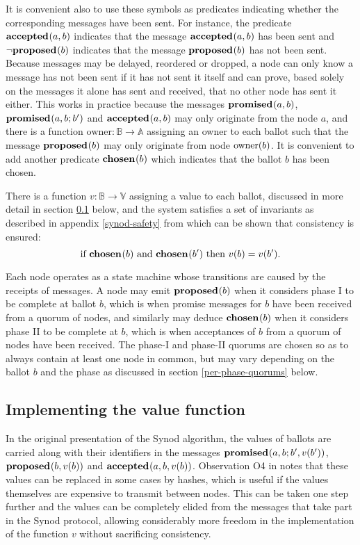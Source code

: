 \documentclass[journal]{IEEEtran}
\begin{document}
It is convenient also to use these symbols as predicates indicating whether the
corresponding messages have been sent. For instance, the predicate
$\mathbf{accepted}_{}(a,b)$ indicates that the message $\mathbf{accepted}_{}(a,b)$ has been sent and
$\neg \mathbf{proposed}_{}(b)$ indicates that the message $\mathbf{proposed}_{}(b)$ has not been sent.
Because messages may be delayed, reordered or dropped, a node can only know a
message has not been sent if it has not sent it itself and can prove, based
solely on the messages it alone has sent and received, that no other node has
sent it either. This works in practice because the messages $\mathbf{promised}_{}(a,b)$,
$\mathbf{promised}_{}(a,b;b')$ and $\mathbf{accepted}_{}(a,b)$ may only originate from the node $a$,
and there is a function $\mathrm{owner} : \mathbb B \to \mathbb A$ assigning an
owner to each ballot such that the message $\mathbf{proposed}_{}(b)$ may only originate
from node $\mathrm{owner}(b)$.  It is convenient to add another predicate
$\mathbf{chosen}_{}(b)$ which indicates that the ballot $b$ has been chosen.

There is a function $v : \mathbb B \to \mathbb V$ assigning a value to each
ballot, discussed in more detail in section \ref{value-function} below, and
the system satisfies a set of invariants as described in appendix
\ref{synod-safety} from which can be shown that consistency is ensured:
\[\textrm{if } \mathbf{chosen}_{}(b) \textrm{ and } \mathbf{chosen}_{}(b') \textrm { then } v(b)
= v(b').\]

Each node operates as a state machine whose transitions are caused by the
receipts of messages. A node may emit $\mathbf{proposed}_{}(b)$ when it considers phase I to
be complete at ballot $b$, which is when promise messages for $b$ have been
received from a quorum of nodes, and similarly may deduce $\mathbf{chosen}_{}(b)$ when
it considers phase II to be complete at $b$, which is when acceptances of $b$
from a quorum of nodes have been received. The phase-I and phase-II quorums are
chosen so as to always contain at least one node in common, but may vary
depending on the ballot $b$ and the phase as discussed in section
\ref{per-phase-quorums} below.

\subsection{Implementing the value function}\label{value-function}

In the original presentation of the Synod algorithm, the values of ballots
are carried along with their identifiers in the messages $\mathbf{promised}_{}(a,b;
b',v(b') )$, $\mathbf{proposed}_{}( b,v(b))$ and $\mathbf{accepted}_{}(a, b,v(b) )$. Observation O4 in
\cite{cheap-paxos} notes that these values can be replaced in some cases by
hashes, which is useful if the values themselves are expensive to transmit
between nodes. This can be taken one step further and the values can be
completely elided from the messages that take part in the Synod protocol,
allowing considerably more freedom in the implementation of the function $v$
without sacrificing consistency.
\end{document}
